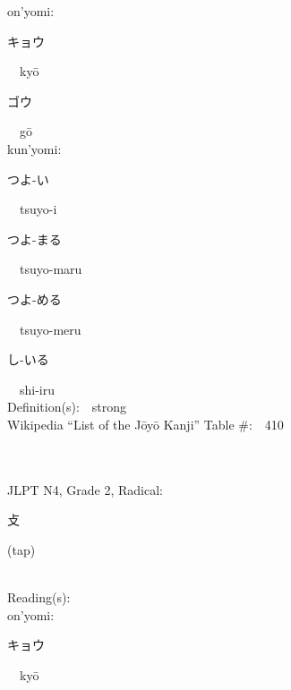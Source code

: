 \begin{multicols}{2}
{\hspace*{1em}}on'yomi:\ \ \\
{\hspace*{2em}}{\begin{CJK}{UTF8}{min} キョウ \end{CJK}}\ \ ky\=o\ \ \\
{\hspace*{2em}}{\begin{CJK}{UTF8}{min} ゴウ \end{CJK}}\ \ g\=o\ \ \\
{\hspace*{1em}}kun'yomi:\ \ \\
{\hspace*{2em}}{\begin{CJK}{UTF8}{min} つよ-い \end{CJK}}\ \ tsuyo-i\ \ \\
{\hspace*{2em}}{\begin{CJK}{UTF8}{min} つよ-まる \end{CJK}}\ \ tsuyo-maru\ \ \\
{\hspace*{2em}}{\begin{CJK}{UTF8}{min} つよ-める \end{CJK}}\ \ tsuyo-meru\ \ \\
{\hspace*{2em}}{\begin{CJK}{UTF8}{min} し-いる \end{CJK}}\ \ shi-iru\ \ \\
Definition(s):\ \ strong \\
Wikipedia ``List of the J\=oy\=o Kanji'' Table \#:\ \ 410 \\
\ \ \\
{\fontsize{34pt}{40pt}  }\ \ \\  %
{JLPT N4, Grade 2, Radical:\ \ {\begin{CJK}{UTF8}{min} 攴 \end{CJK}} (tap) } \\
Reading(s):\ \ \\
{\hspace*{1em}}on'yomi:\ \ \\
{\hspace*{2em}}{\begin{CJK}{UTF8}{min} キョウ \end{CJK}}\ \ ky\=o\ \ \\

\end{multicols}
